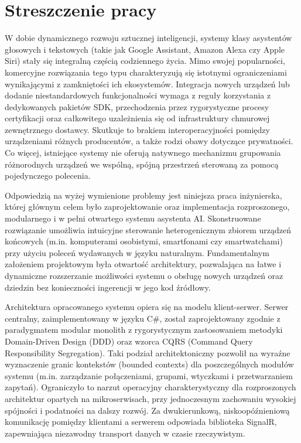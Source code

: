 \chapter*{Streszczenie pracy}
\label{cha:streszczenie-pl}

\makeatletter


\begin{center}
	\noindent \Large \textbf{\@titlePL}
\end{center}

\vspace*{8mm}
W dobie dynamicznego rozwoju sztucznej inteligencji, systemy klasy asystentów głosowych i tekstowych (takie jak Google Assistant, Amazon Alexa czy Apple Siri) stały się integralną częścią codziennego życia. Mimo swojej popularności, komercyjne rozwiązania tego typu charakteryzują się istotnymi ograniczeniami wynikającymi z zamkniętości ich ekosystemów. Integracja nowych urządzeń lub dodanie niestandardowych funkcjonalności wymaga z reguły korzystania z dedykowanych pakietów SDK, przechodzenia przez rygorystyczne procesy certyfikacji oraz całkowitego uzależnienia się od infrastruktury chmurowej zewnętrznego dostawcy. Skutkuje to brakiem interoperacyjności pomiędzy urządzeniami różnych producentów, a także rodzi obawy dotyczące prywatności. Co więcej, istniejące systemy nie oferują natywnego mechanizmu grupowania różnorodnych urządzeń we wspólną, spójną przestrzeń sterowaną za pomocą pojedynczego polecenia.

Odpowiedzią na wyżej wymienione problemy jest niniejsza praca inżynierska, której głównym celem było zaprojektowanie oraz implementacja rozproszonego, modularnego i w pełni otwartego systemu asystenta AI. Skonstruowane rozwiązanie umożliwia intuicyjne sterowanie heterogenicznym zbiorem urządzeń końcowych (m.in. komputerami osobistymi, smartfonami czy smartwatchami) przy użyciu poleceń wydawanych w języku naturalnym. Fundamentalnym założeniem projektowym była otwartość architektury, pozwalająca na łatwe i dynamiczne rozszerzanie możliwości systemu o obsługę nowych urządzeń oraz dziedzin bez konieczności ingerencji w jego kod źródłowy.

Architektura opracowanego systemu opiera się na modelu klient-serwer. Serwer centralny, zaimplementowany w języku C\#, został zaprojektowany zgodnie z paradygmatem modular monolith z rygorystycznym zastosowaniem metodyki Domain-Driven Design (DDD) oraz wzorca CQRS (Command Query Responsibility Segregation). Taki podział architektoniczny pozwolił na wyraźne wyznaczenie granic kontekstów (bounded contexts) dla poszczególnych modułów systemu (m.in. zarządzanie połączeniami, grupami, wtyczkami i przetwarzaniem zapytań). Ograniczyło to narzut operacyjny charakterystyczny dla rozproszonych architektur opartych na mikroserwisach, przy jednoczesnym zachowaniu wysokiej spójności i podatności na dalszy rozwój. Za dwukierunkową, niskoopóźnieniową komunikację pomiędzy klientami a serwerem odpowiada biblioteka SignalR, zapewniająca niezawodny transport danych w czasie rzeczywistym.

